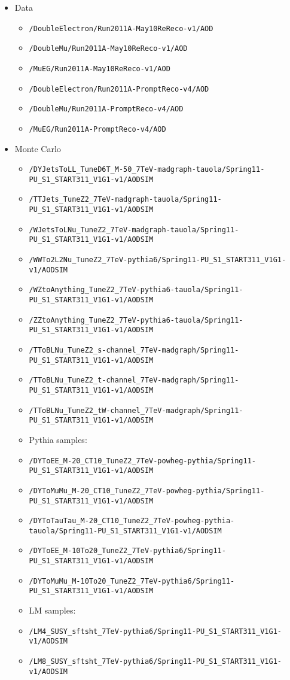 \begin{itemize}
\item Data 
\begin{itemize}
\item \verb=/DoubleElectron/Run2011A-May10ReReco-v1/AOD=
\item \verb=/DoubleMu/Run2011A-May10ReReco-v1/AOD=
\item \verb=/MuEG/Run2011A-May10ReReco-v1/AOD=

\item \verb=/DoubleElectron/Run2011A-PromptReco-v4/AOD=
\item \verb=/DoubleMu/Run2011A-PromptReco-v4/AOD=
\item \verb=/MuEG/Run2011A-PromptReco-v4/AOD=
\end{itemize}

\item Monte Carlo
  \begin{itemize} 
  \item \verb=/DYJetsToLL_TuneD6T_M-50_7TeV-madgraph-tauola/Spring11-PU_S1_START311_V1G1-v1/AODSIM=
  \item \verb=/TTJets_TuneZ2_7TeV-madgraph-tauola/Spring11-PU_S1_START311_V1G1-v1/AODSIM=
  \item \verb=/WJetsToLNu_TuneZ2_7TeV-madgraph-tauola/Spring11-PU_S1_START311_V1G1-v1/AODSIM=
  \item \verb=/WWTo2L2Nu_TuneZ2_7TeV-pythia6/Spring11-PU_S1_START311_V1G1-v1/AODSIM=
  \item \verb=/WZtoAnything_TuneZ2_7TeV-pythia6-tauola/Spring11-PU_S1_START311_V1G1-v1/AODSIM=
  \item \verb=/ZZtoAnything_TuneZ2_7TeV-pythia6-tauola/Spring11-PU_S1_START311_V1G1-v1/AODSIM=
  \item \verb=/TToBLNu_TuneZ2_s-channel_7TeV-madgraph/Spring11-PU_S1_START311_V1G1-v1/AODSIM=
  \item \verb=/TToBLNu_TuneZ2_t-channel_7TeV-madgraph/Spring11-PU_S1_START311_V1G1-v1/AODSIM=
  \item \verb=/TToBLNu_TuneZ2_tW-channel_7TeV-madgraph/Spring11-PU_S1_START311_V1G1-v1/AODSIM=
  \item Pythia samples:
  \item \verb=/DYToEE_M-20_CT10_TuneZ2_7TeV-powheg-pythia/Spring11-PU_S1_START311_V1G1-v1/AODSIM=
  \item \verb=/DYToMuMu_M-20_CT10_TuneZ2_7TeV-powheg-pythia/Spring11-PU_S1_START311_V1G1-v1/AODSIM=
  \item \verb=/DYToTauTau_M-20_CT10_TuneZ2_7TeV-powheg-pythia-tauola/Spring11-PU_S1_START311_V1G1-v1/AODSIM=
  \item \verb=/DYToEE_M-10To20_TuneZ2_7TeV-pythia6/Spring11-PU_S1_START311_V1G1-v1/AODSIM=
  \item \verb=/DYToMuMu_M-10To20_TuneZ2_7TeV-pythia6/Spring11-PU_S1_START311_V1G1-v1/AODSIM=
  \item LM samples:
  \item \verb=/LM4_SUSY_sftsht_7TeV-pythia6/Spring11-PU_S1_START311_V1G1-v1/AODSIM=
  \item \verb=/LM8_SUSY_sftsht_7TeV-pythia6/Spring11-PU_S1_START311_V1G1-v1/AODSIM=
  \end{itemize}
\end{itemize}

